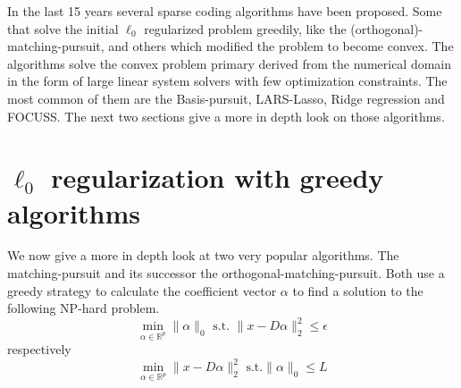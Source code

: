 In the last 15 years several sparse coding algorithms have been proposed. Some
that solve the initial $\ell_0$ regularized problem greedily, like
the (orthogonal)-matching-pursuit, and others which modified the problem to
become convex. The algorithms solve the convex problem  primary derived from the
numerical domain in the form of large linear system solvers with few
optimization constraints. The most common of them are the Basis-pursuit,
LARS-Lasso, Ridge regression and FOCUSS. The next two sections give a more in
depth look on those algorithms. 




\section{$\ell_0$ regularization with greedy algorithms}
We now give a more in depth look at two very popular algorithms. 
The matching-pursuit and its successor the orthogonal-matching-pursuit.
Both use a greedy strategy to calculate the coefficient vector $\alpha$ to find
a solution to the following NP-hard problem.
\begin{equation}
\min_{\alpha\in\mathbb{R}^{p}}   \lVert \alpha \rVert_{0}   \textrm{ s.t. }
\lVert x - D\alpha \rVert^{2}_{2} \leq \epsilon
\end{equation}
respectively
\begin{equation}
\min_{\alpha\in\mathbb{R}^{p}}  \lVert x - D\alpha \rVert^{2}_{2} \textrm{ s.t.
} \lVert \alpha \rVert_{0} \leq L
\end{equation}
\cite{Mallat1993}

